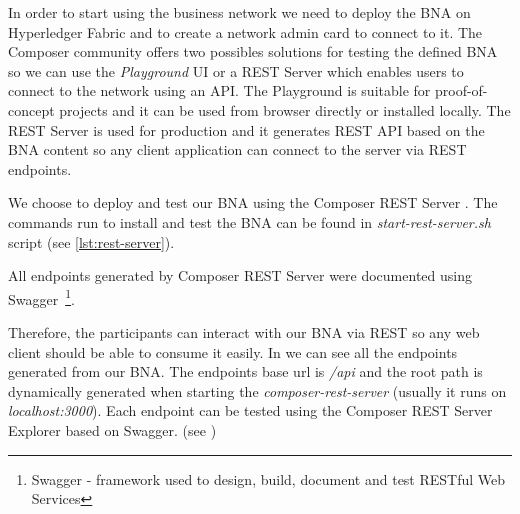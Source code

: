 
In order to start using the business network we need to deploy the BNA on Hyperledger Fabric and to create a network admin card to connect to it.
The Composer community offers two possibles solutions for testing the defined BNA so we can use the \emph{Playground} UI or a REST Server which enables users to connect to the network using an API. The Playground is suitable for proof-of-concept projects and it can be used from browser directly or installed locally. The REST Server is used for production and it generates REST API based on the BNA content so any client application can connect to the server via REST endpoints.

We choose to deploy and test our BNA using the Composer REST Server \cite{composer-restserver}. The commands run to install and test the BNA can be found in \emph{start-rest-server.sh} script (see \ref{lst:rest-server}).

All endpoints generated by Composer REST Server were documented using Swagger~\footnote{Swagger - framework used to design, build, document and test RESTful Web Services}.

Therefore, the {\project} participants can interact with our BNA via REST so any web client should be able to consume it easily. In  we can see all the endpoints generated from our BNA. The endpoints base url is \emph{/api} and the root path is dynamically generated when starting the \emph{composer-rest-server} (usually it runs on \emph{localhost:3000}). Each endpoint can be tested using the Composer REST Server Explorer based on Swagger. (see ) 












